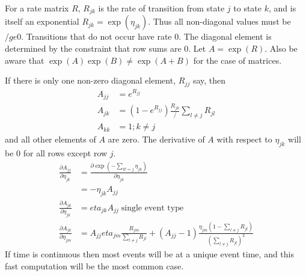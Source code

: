 \documentclass{article}
\begin{document}
For a rate matrix $R$, $R_{jk}$ is the rate of transition from state $j$ to
state $k$, and is itself an exponential $R_{jk} = \exp(\eta_{jk})$.
Thus all non-diagonal values must be $/ge 0$.  Transitions that do not occur
have rate 0. 
The diagonal element is determined by the constraint that row sums are 0.
Let $A= \exp(R)$.
Also be aware that $\exp(A)\exp(B) \ne \exp(A+B)$ for the case of matrices.

If there is only one non-zero diagonal element, $R_{jj}$ say, then
\begin{align*} 
    A_{jj} &= e^{R_{jj}} \\
    A_{jk} &= \left(1- e^{R_{jj}}\right) \frac{R_{jk}}/{\sum_{l\ne j} R_{jl}} \\
    A_{kk} &= 1; k\ne j 
\end{align*}
and all other elements of $A$ are zero.
The derivative of $A$ with respect to $\eta_{jk}$ will be 0 for all rows
except row $j$.
\begin{align*} 
  \frac{\partial A_{jj}}{\partial \eta_{jk}} &=
    \frac{\partial \exp(-\sum_{k!=j} \eta_{jk})}{\partial \eta_{jk}}  \\
   &= -\eta_{jk} A_{jj} \\
 \frac{\partial A_{jk}}{\partial \eta_{jk}} &= eta_{jk}A_{jj} 
     \;\mbox{single event type} \\
    \frac{\partial A_{jk}}{\partial \eta_{jm}}&=  
      A_{jj} eta_{jm}\frac{R_{jm}}{\sum_{l\ne j} R_{jl}} +
      (A_{jj} -1) \frac{\eta_{jm} (1- \sum_{l\ne j} R_{jl})}{(\sum_{l\ne j} R_{jl})^2}
\end{align*}
If time is continuous then most events will be at a unique event time, and this
fast computation will be the most common case.
    
\end{document}
